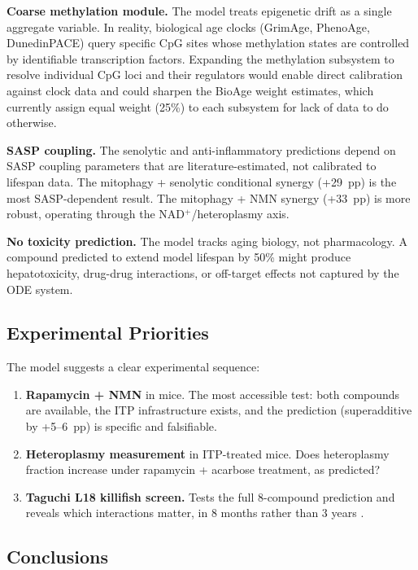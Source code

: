 \documentclass[11pt]{article}
\begin{document}
\textbf{Coarse methylation module.} The model treats epigenetic drift as a single aggregate variable. In reality, biological age clocks (GrimAge, PhenoAge, DunedinPACE) query specific CpG sites whose methylation states are controlled by identifiable transcription factors. Expanding the methylation subsystem to resolve individual CpG loci and their regulators would enable direct calibration against clock data and could sharpen the BioAge weight estimates, which currently assign equal weight (25\%) to each subsystem for lack of data to do otherwise.

\textbf{SASP coupling.} The senolytic and anti-inflammatory predictions depend on SASP coupling parameters that are literature-estimated, not calibrated to lifespan data. The mitophagy + senolytic conditional synergy (+29~pp) is the most SASP-dependent result. The mitophagy + NMN synergy (+33~pp) is more robust, operating through the NAD$^+$/heteroplasmy axis.

\textbf{No toxicity prediction.} The model tracks aging biology, not pharmacology. A compound predicted to extend model lifespan by 50\% might produce hepatotoxicity, drug-drug interactions, or off-target effects not captured by the ODE system.

\subsection{Experimental Priorities}

The model suggests a clear experimental sequence:

\begin{enumerate}
\item \textbf{Rapamycin + NMN} in mice. The most accessible test: both compounds are available, the ITP infrastructure exists, and the prediction (superadditive by +5--6~pp) is specific and falsifiable.
\item \textbf{Heteroplasmy measurement} in ITP-treated mice. Does heteroplasmy fraction increase under rapamycin + acarbose treatment, as predicted?
\item \textbf{Taguchi L18 killifish screen.} Tests the full 8-compound prediction and reveals which interactions matter, in 8 months rather than 3 years \citep{Biggs2025taguchi}.
\end{enumerate}

\subsection{Conclusions}
\end{document}
